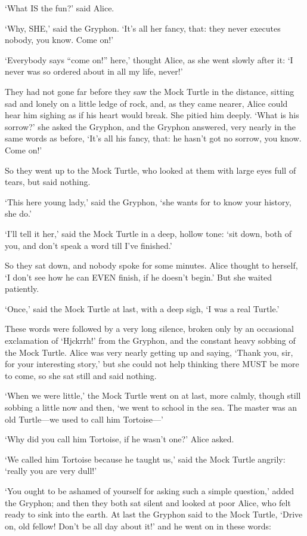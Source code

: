 \documentclass[12pt]{article}
\begin{document}
\begin{Parallel}[p]{}{}
{‘What IS the fun?’ said Alice.

‘Why, SHE,’ said the Gryphon. ‘It’s all her fancy, that: they never executes nobody, you know. Come on!’

‘Everybody says “come on!” here,’ thought Alice, as she went slowly after it: ‘I never was so ordered about in all my life, never!’

They had not gone far before they saw the Mock Turtle in the distance, sitting sad and lonely on a little ledge of rock, and, as they came nearer, Alice could hear him sighing as if his heart would break. She pitied him deeply. ‘What is his sorrow?’ she asked the Gryphon, and the Gryphon answered, very nearly in the same words as before, ‘It’s all his fancy, that: he hasn’t got no sorrow, you know. Come on!’

So they went up to the Mock Turtle, who looked at them with large eyes full of tears, but said nothing.

‘This here young lady,’ said the Gryphon, ‘she wants for to know your history, she do.’

‘I’ll tell it her,’ said the Mock Turtle in a deep, hollow tone: ‘sit down, both of you, and don’t speak a word till I’ve finished.’

So they sat down, and nobody spoke for some minutes. Alice thought to herself, ‘I don’t see how he can EVEN finish, if he doesn’t begin.’ But she waited patiently.

‘Once,’ said the Mock Turtle at last, with a deep sigh, ‘I was a real Turtle.’

These words were followed by a very long silence, broken only by an occasional exclamation of ‘Hjckrrh!’ from the Gryphon, and the constant heavy sobbing of the Mock Turtle. Alice was very nearly getting up and saying, ‘Thank you, sir, for your interesting story,’ but she could not help thinking there MUST be more to come, so she sat still and said nothing.

‘When we were little,’ the Mock Turtle went on at last, more calmly, though still sobbing a little now and then, ‘we went to school in the sea. The master was an old Turtle—we used to call him Tortoise—’

‘Why did you call him Tortoise, if he wasn’t one?’ Alice asked.

‘We called him Tortoise because he taught us,’ said the Mock Turtle angrily: ‘really you are very dull!’

‘You ought to be ashamed of yourself for asking such a simple question,’ added the Gryphon; and then they both sat silent and looked at poor Alice, who felt ready to sink into the earth. At last the Gryphon said to the Mock Turtle, ‘Drive on, old fellow! Don’t be all day about it!’ and he went on in these words:

}
\end{Parallel}
\end{document}
